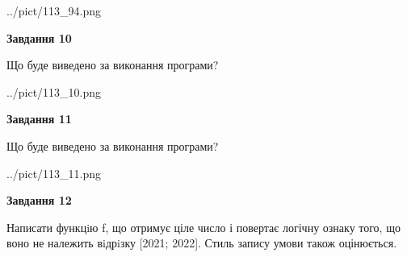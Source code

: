 \documentclass[12pt, ukrainian]{article}
\begin{document}
{\begin {large}
\begin{center}
	{../pict/113_94.png}
\end{center}
\newpage

{\begin {center}\textbf{Завдання 10}\end {center}}

Що буде виведено за виконання програми?\par
\begin{center}
	{../pict/113_10.png}
\end{center}
\newpage

{\begin {center}\textbf{Завдання 11}\end {center}}

Що буде виведено за виконання програми?\par
\begin{center}
	{../pict/113_11.png}
\end{center}
\newpage

{\begin {center}\textbf{Завдання 12}\end {center}}


Написати функцiю f, що отримує ціле число і повертає логічну ознаку того, що воно не належить вiдрiзку [2021; 2022]. Стиль запису умови також оцінюється.\par
\newpage

\end {large}}
\end{document}
